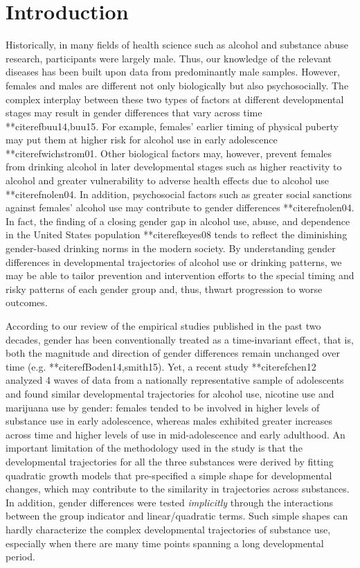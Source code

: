 
\section{Introduction} 
Historically, in many fields of health
science such as alcohol and substance abuse research, participants
were largely male. Thus, our knowledge of the relevant diseases
has been built upon data from predominantly male samples. However,
females and males are different not only biologically but also
psychosocially. The complex interplay between these two types of
factors at different developmental stages may result in gender
differences that vary across time **citeref{buu14,buu15}. For example,
females' earlier timing of physical puberty may put them at higher
risk for alcohol use in early adolescence **citeref{wichstrom01}.
Other biological factors may, however, prevent females from
drinking alcohol in later developmental stages such as higher
reactivity to alcohol and greater vulnerability to adverse health
effects due to alcohol use **citeref{nolen04}. In addition,
psychosocial factors such as greater social sanctions against
females' alcohol use may contribute to gender differences
**citeref{nolen04}. In fact, the finding of a closing gender gap in
alcohol use, abuse, and dependence in the United States population
**citeref{keyes08} tends to reflect the diminishing gender-based
drinking norms in the modern society. By understanding gender
differences in developmental trajectories of alcohol use or
drinking patterns, we may be able to tailor prevention and
intervention efforts to the special timing and risky patterns of
each gender group and, thus, thwart progression to worse outcomes.

According to our review of the empirical studies published in the
past two decades, gender has been conventionally treated as a
time-invariant effect, that is, both the magnitude and direction
of gender differences remain unchanged over time (e.g.
**citeref{Boden14,smith15}). Yet, a recent study **citeref{chen12}
analyzed 4 waves of data from a nationally representative sample
of adolescents and found similar developmental trajectories for
alcohol use, nicotine use and marijuana use by gender: females
tended to be involved in higher levels of substance use in early
adolescence, whereas males exhibited greater increases across time
and higher levels of use in mid-adolescence and early adulthood.
An important limitation of the methodology used in the study is
that the developmental trajectories for all the three substances
were derived by fitting quadratic growth models that pre-specified
a simple shape for developmental changes, which may contribute to
the similarity in trajectories across substances. In addition,
gender differences were tested \emph{implicitly} through the
interactions between the group indicator and linear/quadratic
terms. Such simple shapes can hardly characterize the complex
developmental trajectories of substance use, especially when there
are many time points spanning a long developmental period.

